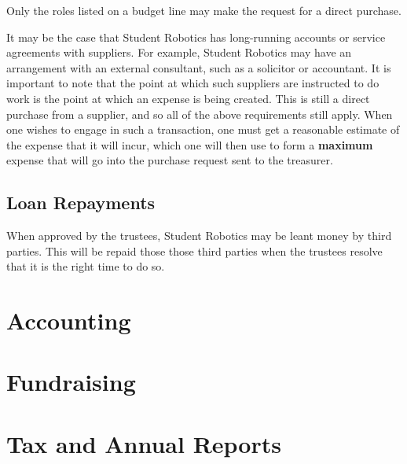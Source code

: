 Only the roles listed on a budget line may make the request for a direct purchase.

It may be the case that Student Robotics has long-running accounts or service agreements with suppliers.  For example, Student Robotics may have an arrangement with an external consultant, such as a solicitor or accountant.  It is important to note that the point at which such suppliers are instructed to do work is the point at which an expense is being created.  This is still a direct purchase from a supplier, and so all of the above requirements still apply.  When one wishes to engage in such a transaction, one must get a reasonable estimate of the expense that it will incur, which one will then use to form a \textbf{maximum} expense that will go into the purchase request sent to the treasurer.

\subsection{Loan Repayments}

When approved by the trustees, Student Robotics may be leant money by third parties.  This will be repaid those those third parties when the trustees resolve that it is the right time to do so.

\section{Accounting}

\section{Fundraising}

\section{Tax and Annual Reports}

